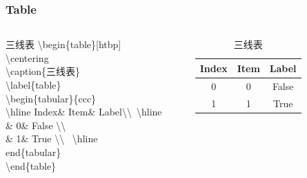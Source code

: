 \begin{frame}
    \frametitle{Table}
    \begin{columns}
        \begin{column}{0.45\textwidth}
            \begin{block}{三线表}
                \textbackslash begin\{table\}[htbp] \\
                \quad \textbackslash centering\\
                \quad \textbackslash caption\{三线表\}\\
                \quad \textbackslash label\{table\}\\
                \quad \textbackslash begin\{tabular\}\{ccc\}\\
                \quad \quad \textbackslash hline Index\& Item\& Label\textbackslash \textbackslash \, \textbackslash hline\\
                \quad {}\& 0\& False \textbackslash \textbackslash\\
                \quad {}\& 1\& True \textbackslash\textbackslash
                \, \textbackslash hline\\
                \quad end\{tabular\}\\
                \textbackslash end\{table\}\\
            \end{block}
        \end{column}
        \begin{column}{0.45\textwidth}
            \begin{table}[htbp]
                \centering
                \caption{三线表}
                \label{table}
                \begin{tabular}{ccc}
                    \hline Index&Item&Label\\ \hline
                    0&0&False \\ 
                    1&1&True \\ \hline
                \end{tabular}
            \end{table}
        \end{column}
        \begin{column}{0.06\textwidth}
        \end{column}
    \end{columns}
\end{frame}

